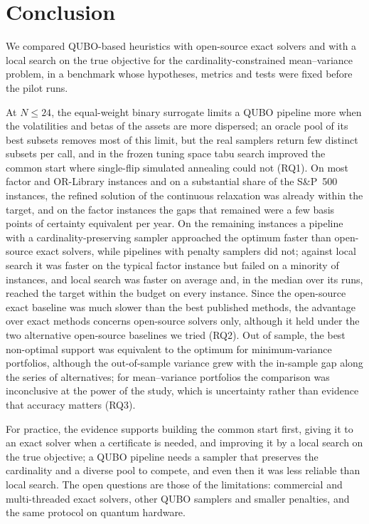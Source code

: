 \section{Conclusion}\label{sec:conclusion}

We compared QUBO-based heuristics with open-source exact solvers and with a local search on the true objective for the
cardinality-constrained mean--variance problem, in a benchmark whose hypotheses, metrics and tests were fixed before
the pilot runs.

At $N \le 24$, the equal-weight binary surrogate limits a QUBO pipeline more when the volatilities and betas of the
assets are more dispersed; an oracle pool of its best subsets removes most of this limit, but the real samplers return
few distinct subsets per call, and in the frozen tuning space tabu search improved the common start where single-flip
simulated annealing could not (RQ1). On most factor and OR-Library instances and on a substantial share of the S\&P~500
instances, the refined solution of the continuous relaxation was already within the target, and on the factor instances
the gaps that remained were a few basis points of certainty equivalent per year. On the remaining instances a pipeline
with a cardinality-preserving sampler approached the optimum faster than open-source exact solvers, while pipelines
with penalty samplers did not; against local search it was faster on the typical factor instance but failed on a
minority of instances, and local search was faster on average and, in the median over its runs, reached the target
within the budget on every instance. Since the open-source exact baseline was
much slower than the best published methods, the advantage over exact methods concerns open-source solvers only,
although it held under the two alternative open-source baselines we tried (RQ2).
Out of sample, the best non-optimal support was equivalent to the optimum for minimum-variance portfolios, although the
out-of-sample variance grew with the in-sample gap along the series of alternatives; for mean--variance portfolios the
comparison was inconclusive at the power of the study, which is uncertainty rather than evidence that accuracy matters
(RQ3).

For practice, the evidence supports building the common start first, giving it to an exact solver when a certificate is
needed, and improving it by a local search on the true objective; a QUBO pipeline needs a sampler that preserves the
cardinality and a diverse pool to compete, and even then it was less reliable than local search. The open questions are
those of the limitations: commercial and multi-threaded exact solvers, other QUBO samplers and smaller penalties, and
the same protocol on quantum hardware.
